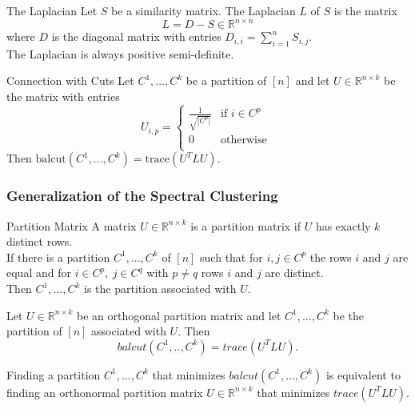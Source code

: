 \documentclass{panikzettel}
\begin{document}
\begin{halfboxl}
\vspace{-\baselineskip}
	\begin{defi}{The Laplacian}
	Let $S$ be a similarity matrix. The Laplacian $L$ of $S$ is the matrix
	\[
	L=D-S\in \mathbb{R}^{n\times n}
	\]
	where $D$ is the diagonal matrix with entries $D_{i,i}=\sum_{i=1}^n S_{i,j}$.\\
	The Laplacian is always positive semi-definite.
	\end{defi}
\end{halfboxl}
\begin{halfboxr}
\vspace{-\baselineskip}
	\begin{theo}{Connection with Cuts}
	Let $C^1, ..., C^k$ be a partition of $[n]$ and let $U\in\mathbb{R}^{n\times k}$ be the matrix with entries
	\[
	U_{i,p}=
	\begin{cases}
	\frac{1}{\sqrt{|C^p|}} & \text{if } i\in C^p \\
	0 & \text{otherwise } \\
	\end{cases}
	\]
	Then $\text{balcut}(C^1,...,C^k)=\text{trace}(U^TLU)$.
	\end{theo}
\end{halfboxr}



\subsubsection{Generalization of the Spectral Clustering}
\begin{halfboxl}
\vspace{-\baselineskip}
	\begin{defi}{Partition Matrix}
	A matrix $U\in\mathbb{R}^{n\times k}$ is a partition matrix if $U$ has exactly $k$ distinct rows.\\

	If there is a partition $C^1,...,C^k$ of $[n]$ such that for $i,j\in C^p$ the rows $i$ and $j$ are equal and for $i\in C^p, \ j\in C^q$ with $p\neq q$ rows $i$ and $j$ are distinct.\\
	Then $C^1,...,C^k$ is the partition associated with $U$.
	\end{defi}
\end{halfboxl}
\begin{halfboxr}
\vspace{-\baselineskip}
	\begin{theo}{}
	Let $U\in \mathbb{R}^{n\times k}$ be an orthogonal partition matrix and let $C^1,...,C^k$ be the partition of $[n]$ associated with $U$. Then
	\[
	balcut(C^1,..,C^k)=trace(U^TLU).
	\]
	\end{theo}
	Finding a partition $C^1,...,C^k$ that minimizes $balcut(C^1,...,C^k)$ is equivalent to finding an orthonormal partition matrix $U\in\mathbb{R}^{n\times k}$ that minimizes $trace(U^TLU)$.
\end{halfboxr}
\end{document}
